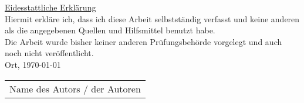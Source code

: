   \begin{titlepage}
      \vspace*{5cm}
      {\underline{Eidesstattliche Erkl\"{a}rung}}\\[1cm]
      Hiermit erkl\"{a}re ich, dass ich diese Arbeit selbstst\"{a}ndig verfasst und keine anderen als die angegebenen
      Quellen und Hilfsmittel benutzt habe.\\[1cm]
      Die Arbeit wurde bisher keiner anderen Pr\"{u}fungsbeh\"{o}rde vorgelegt und auch noch nicht ver\"{o}ffentlicht.\\[4cm]
      Ort, \today
      \hfill
      \begin{tabular}{l}
          \hline
          Name des Autors / der Autoren
      \end{tabular}

      \end{titlepage}
      \if@twoside
      \newpage
      \fi